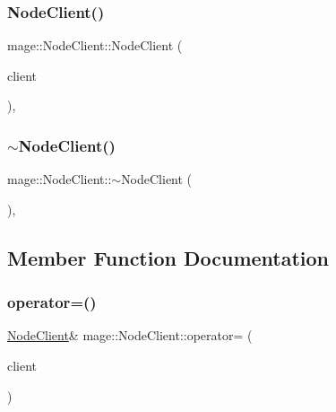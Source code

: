 \hypertarget{classmage_1_1_node_client_a3fed0bff5d3bb0c83982eb7231132861}{}\label{classmage_1_1_node_client_a3fed0bff5d3bb0c83982eb7231132861} 
\subsubsection{\texorpdfstring{Node\+Client()}{NodeClient()}\hspace{0.1cm}{\footnotesize\ttfamily [3/3]}}
{\footnotesize\ttfamily mage\+::\+Node\+Client\+::\+Node\+Client (\begin{DoxyParamCaption}\item[{\hyperlink{classmage_1_1_node_client}{Node\+Client} \&\&}]{client }\end{DoxyParamCaption})\hspace{0.3cm}{\ttfamily [private]}, {\ttfamily [delete]}}

\hypertarget{classmage_1_1_node_client_a62fe48b254a6daeac617189ba587966f}{}\label{classmage_1_1_node_client_a62fe48b254a6daeac617189ba587966f} 
\subsubsection{\texorpdfstring{$\sim$\+Node\+Client()}{~NodeClient()}}
{\footnotesize\ttfamily mage\+::\+Node\+Client\+::$\sim$\+Node\+Client (\begin{DoxyParamCaption}{ }\end{DoxyParamCaption})\hspace{0.3cm}{\ttfamily [private]}, {\ttfamily [delete]}}



\subsection{Member Function Documentation}
\hypertarget{classmage_1_1_node_client_a17f705ea878c04485c18d5a57b8c4aac}{}\label{classmage_1_1_node_client_a17f705ea878c04485c18d5a57b8c4aac} 
\subsubsection{\texorpdfstring{operator=()}{operator=()}\hspace{0.1cm}{\footnotesize\ttfamily [1/2]}}
{\footnotesize\ttfamily \hyperlink{classmage_1_1_node_client}{Node\+Client}\& mage\+::\+Node\+Client\+::operator= (\begin{DoxyParamCaption}\item[{const \hyperlink{classmage_1_1_node_client}{Node\+Client} \&}]{client }\end{DoxyParamCaption})\hspace{0.3cm}{\ttfamily [delete]}}

